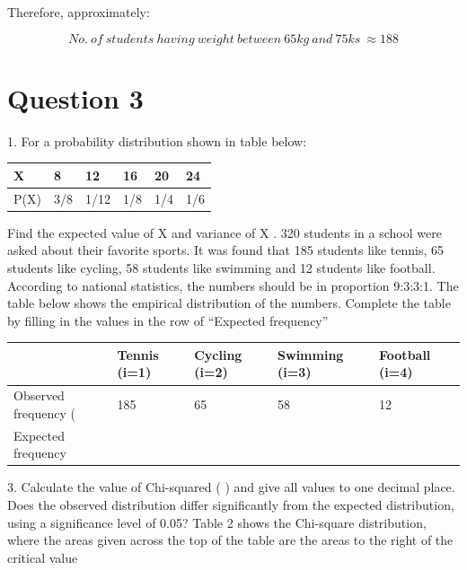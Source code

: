 \documentclass[a4paper]{report}
\begin{document}
Therefore, approximately:

\begin{equation*}
    \boxed{No.\ of\ students\ having\ weight\ between\ 65kg\ and\ 75ks\ \approx 188}
\end{equation*}

\newpage 
\section*{Question 3}

1. For a probability distribution shown in table below:

\begin{table}[h]
\centering

\begin{tabular}{| l | l | l | l | l | l |}
\hline
X & 8 & 12 & 16 & 20 & 24 \\
\hline
P(X) & 3/8 & 1/12 & 1/8 & 1/4 & 1/6 \\
\hline

\end{tabular}

\end{table}

 Find the expected value of X and variance of X 
. 320 students in a school were asked about their favorite sports. It was found that 185 students like tennis, 65 students like cycling, 58 students like swimming and 12 students like football. According to national statistics, the numbers should be in proportion 9:3:3:1. The table below shows the empirical distribution of the numbers. Complete the table by filling in the values in the row of “Expected frequency” 

 

\begin{table}[h]
\centering
\begin{tabular}{| l | l | l | l | l |}
\hline
  & Tennis (i=1) & Cycling (i=2) & Swimming (i=3) & Football (i=4) \\
\hline
Observed frequency ( & 185 & 65 & 58 & 12 \\
\hline
Expected frequency &   &   &   &   \\
\hline
\end{tabular}
\end{table} 

3. Calculate the value of Chi-squared ( ) and give all values to one decimal place. Does the observed distribution differ significantly from the expected distribution, using a significance level of 0.05? Table 2 shows the Chi-square distribution, where the areas given across the top of the table are the areas to the right of the critical value 
\end{document}
